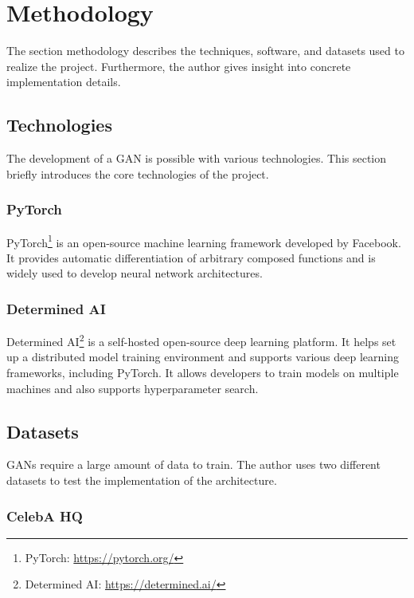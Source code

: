 \section{Methodology}

The section methodology describes the techniques, software, and datasets used to realize the project. Furthermore, the author gives insight into concrete implementation details.

\subsection{Technologies}

The development of a GAN is possible with various technologies. This section briefly introduces the core technologies of the project.

\subsubsection{PyTorch}

PyTorch\footnote{PyTorch: \url{https://pytorch.org/}} is an open-source machine learning framework developed by Facebook. It provides automatic differentiation of arbitrary composed functions and is widely used to develop neural network architectures.

\subsubsection{Determined AI}

Determined AI\footnote{Determined AI: \url{https://determined.ai/}} is a self-hosted open-source deep learning platform. It helps set up a distributed model training environment and supports various deep learning frameworks, including PyTorch. It allows developers to train models on multiple machines and also supports hyperparameter search.

\subsection{Datasets}

GANs require a large amount of data to train. The author uses two different datasets to test the implementation of the architecture.

\subsubsection{CelebA HQ}

